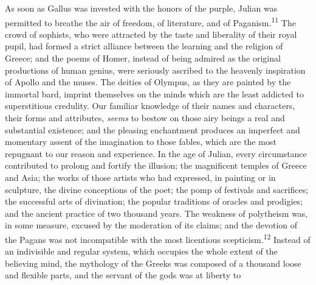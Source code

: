 

As soon as Gallus was invested with the honors of the purple,
Julian was permitted to breathe the air of freedom, of
literature, and of Paganism.\textsuperscript{11} The crowd of sophists, who were
attracted by the taste and liberality of their royal pupil, had
formed a strict alliance between the learning and the religion of
Greece; and the poems of Homer, instead of being admired as the
original productions of human genius, were seriously ascribed to
the heavenly inspiration of Apollo and the muses. The deities of
Olympus, as they are painted by the immortal bard, imprint
themselves on the minds which are the least addicted to
superstitious credulity. Our familiar knowledge of their names
and characters, their forms and attributes, \textit{seems} to bestow on
those airy beings a real and substantial existence; and the
pleasing enchantment produces an imperfect and momentary assent
of the imagination to those fables, which are the most repugnant
to our reason and experience. In the age of Julian, every
circumstance contributed to prolong and fortify the illusion; the
magnificent temples of Greece and Asia; the works of those
artists who had expressed, in painting or in sculpture, the
divine conceptions of the poet; the pomp of festivals and
sacrifices; the successful arts of divination; the popular
traditions of oracles and prodigies; and the ancient practice of
two thousand years. The weakness of polytheism was, in some
measure, excused by the moderation of its claims; and the
devotion of the Pagans was not incompatible with the most
licentious scepticism.\textsuperscript{12} Instead of an indivisible and regular
system, which occupies the whole extent of the believing mind,
the mythology of the Greeks was composed of a thousand loose and
flexible parts, and the servant of the gods was at liberty to
